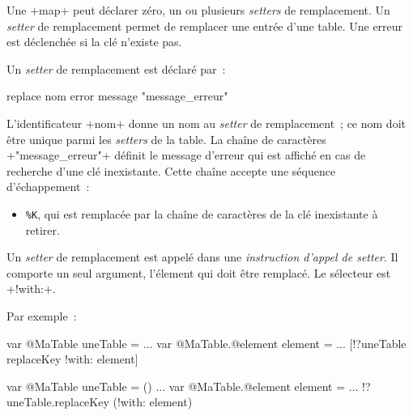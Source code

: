 Une \ggsq+map+ peut déclarer zéro, un ou plusieurs \emph{setters} de remplacement. Un \emph{setter} de remplacement permet de remplacer une entrée d'une table. Une erreur est déclenchée si la clé n'existe pas.


Un \emph{setter} de remplacement est déclaré par~:

\begin{galgas4}
replace nom error message "message_erreur"
\end{galgas4}

\begin{galgas4}
\end{galgas4}

L'identificateur \ggsq+nom+ donne un nom au \emph{setter} de remplacement~; ce nom doit être unique parmi les \emph{setters} de la table. La chaîne de caractères \ggsq+"message_erreur"+ définit le message d'erreur qui est affiché en cas de recherche d'une clé inexistante. Cette chaîne accepte une séquence d'échappement~:
\begin{itemize}
  \item \texttt{\%K}, qui est remplacée par la chaîne de caractères de la clé inexistante à retirer.
\end{itemize}


Un \emph{setter} de remplacement est appelé dans une \emph{instruction d'appel de setter}. Il comporte un seul argument, l'élement qui doit être remplacé. Le sélecteur est \ggsq+!with:+.


Par exemple~:

\begin{galgas4}
var @MaTable uneTable = {}
...
var @MaTable.@element element = ...
[!?uneTable replaceKey !with: element]
\end{galgas4}


\begin{galgas4}
var @MaTable uneTable = ()
...
var @MaTable.@element element = ...
!?uneTable.replaceKey (!with: element)
\end{galgas4}








%
%


